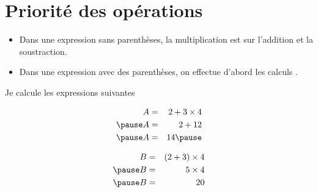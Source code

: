 \documentclass[xcolor={dvipsnames}]{beamer}
\begin{document}
\section{Priorité des opérations}


\begin{frame}
	\begin{myprops}
		\begin{itemize}
			\item Dans une expression sans parenthèses, la multiplication est  sur l'addition et la soustraction.\pause
			
			\item Dans une expression avec des parenthèses, on effectue d'abord les calculs .\pause
		\end{itemize}
	\end{myprops}



	\begin{myexs}
		Je calcule les expressions suivantes
		\vspace*{-0.5cm}
		
		\begin{eqnarray*}
			A &=& 2 + 3 \times 4 \\ \pause
			A &=& 2 + 12 \\ \pause
			A &=& 14 \pause
		\end{eqnarray*}
		
			\vspace*{-1cm}
		
		\begin{eqnarray*}
			B &=& (2 + 3) \times 4 \\ \pause
			B &=& 5 \times 4 \\ \pause
			B &=& 20
		\end{eqnarray*}
		
	\end{myexs}
	
\end{frame}
\end{document}
